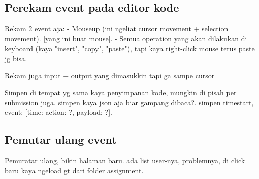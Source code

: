 
\subsection{Perekam event pada editor kode}
\label{sec:3:2:rekam}

Rekam 2 event aja:
- Mouseup (ini ngeliat cursor movement + selection movement). [yang ini buat mouse].
- Semua operation yang akan dilakukan di keyboard (kaya "insert", "copy", "paste"), tapi kaya right-click mouse terus paste jg bisa.

Rekam juga input + output yang dimasukkin tapi ga sampe cursor

Simpen di tempat yg sama kaya penyimpanan kode, mungkin di pisah per submission juga. simpen kaya json aja biar gampang dibaca?. simpen timestart, event: [time: {action: ?, payload: ?}].

\subsection{Pemutar ulang event}
\label{sec:3:2:pemutarulang}

Pemuratar ulang, bikin halaman baru. ada list user-nya, problemnya, di click baru kaya ngeload gt dari folder assignment.